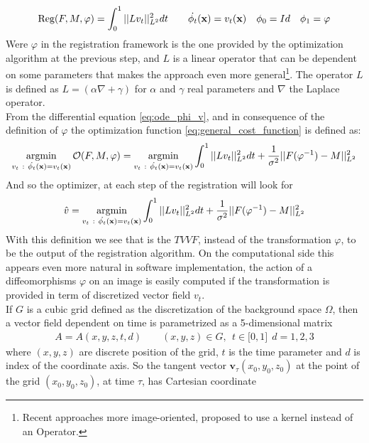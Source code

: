 \begin{align*}
\text{Reg}(F,M,\varphi) =  \int_0^1  \vert\lvert L v_{t}  \rvert\vert_{L^{2}}^{2}  dt
\qquad 
\dot{\phi_{t}} (\mathbf{x}) = v_{t}(\mathbf{x} ) 
\quad 
\phi_{0} = Id
\quad 
\phi_{1} = \varphi
\end{align*}
Were $\varphi$ in the registration framework is the one provided by the optimization algorithm at the previous step, and $L$ is a linear operator that can be dependent on some parameters that makes the approach even more general\footnote{Recent approaches more image-oriented, proposed to use a kernel instead of an Operator.}. The operator $L$ is defined as $L = (\alpha\nabla + \gamma)$ for $\alpha$ and $\gamma$ real parameters and $\nabla$ the Laplace operator.\\
From the differential equation \ref{eq:ode_phi_v}, and in consequence of the definition of $\varphi$ the optimization function \ref{eq:general_cost_function} is defined as:
\begin{align*}
\argmin_{v_{t} ~ : ~ \dot{\phi_{t}} (\mathbf{x}) = v_{t}(\mathbf{x} ) } 
\mathcal{O}(F, M, \varphi) 
= 
\argmin_{v_{t} ~ : ~ \dot{\phi_{t}} (\mathbf{x}) = v_{t}(\mathbf{x} ) } 
\int_0^1 \euclideanMetric{L v_{t} }_{L^{2}}^{2} dt + \frac{1}{\sigma^2}\euclideanMetric{F(\varphi^{-1})  - M  }_{L^{2}}^{2}
\end{align*}
And so the optimizer, at each step of the registration will look for
\begin{align*}
\hat{v} 
= 
\argmin_{v_{t} ~ : ~ \dot{\phi_{t}} (\mathbf{x}) = v_{t}(\mathbf{x} ) } 
\int_0^1 \euclideanMetric{L v_{t} }_{L^{2}}^{2} dt + \frac{1}{\sigma^2}\euclideanMetric{F(\varphi^{-1})  - M  }_{L^{2}}^{2}
\end{align*}
With this definition we see that is the $TVVF$, instead of the transformation $\varphi$, to be the output of the registration algorithm. On the computational side this appears even more natural in software implementation, the action of a diffeomorphisms $\varphi$ on an image is easily computed if the transformation is provided in term of discretized vector field $v_{t}$. \\
If $G$ is a cubic grid defined as the discretization of the background space $\Omega$, then a vector field dependent on time is parametrized as a 5-dimensional matrix
\begin{align*}
A = A(x,y,z,t,d) \qquad (x,y,z)\in G , ~~ t \in \lbrack 0,1\rbrack  ~~ d = 1,2,3
\end{align*}
where $(x,y,z)$ are discrete position of the grid, $t$ is the time parameter and $d$ is index of the coordinate axis. So the tangent vector $\mathbf{v}_{\tau}(x_0,y_0,z_0)$ at the point of the grid $(x_0,y_0,z_0)$, at time $\tau$, has Cartesian coordinate
